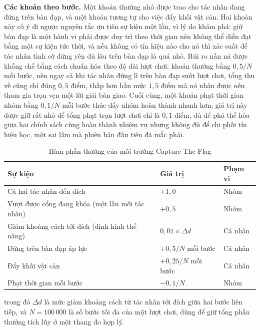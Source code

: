 \indent \textbf{Các khoản theo bước.} Một khoản thưởng nhỏ được trao cho tác nhân đang
đứng trên bàn đạp, và một khoản tương tự cho việc đẩy khối vật cản. Hai khoản này cố ý
đi ngược nguyên tắc ưu tiên sự kiện một lần, vì lý do khám phá: giữ bàn đạp là một hành
vi phải được duy trì theo thời gian nên không thể diễn đạt bằng một sự kiện tức
thời, và nếu không có tín hiệu nào cho nó thì xác suất để tác nhân tình cờ đứng yên đủ
lâu trên bàn đạp là quá nhỏ. Rủi ro nấn ná được khống chế bằng cách chuẩn hóa theo độ
dài lượt chơi: khoản thưởng bằng $0{,}5/N$ mỗi bước, nên ngay cả khi tác nhân đứng lì
trên bàn đạp suốt lượt chơi, tổng thu về cũng chỉ đúng $0{,}5$ điểm, thấp hơn hẳn mức
$1{,}5$ điểm mà nó nhận được nếu tham gia trọn vẹn một lời giải bàn giao. Cuối cùng, một
khoản phạt thời gian nhóm bằng $0{,}1/N$ mỗi bước thúc đẩy nhóm hoàn thành nhanh hơn;
giá trị này được giữ rất nhỏ để tổng phạt trọn lượt chơi chỉ là $0{,}1$ điểm, đủ để phá
thế hòa giữa hai chính sách cùng hoàn thành nhiệm vụ nhưng không đủ để chi phối tín hiệu
học, một sai lầm mà phiên bản đầu tiên đã mắc phải.

\begin{table}[H]
\centering
\caption{Hàm phần thưởng của môi trường Capture The Flag}
\label{tab:reward_capture}
\renewcommand{\arraystretch}{1.4}
\tablefont
\begin{tabular}{|p{7cm}|>{\centering\arraybackslash}p{3.4cm}|>{\centering\arraybackslash}p{2.8cm}|}
\hline
\textbf{Sự kiện} & \textbf{Giá trị} & \textbf{Phạm vi} \\
\hline
Cả hai tác nhân đến đích & $+1{,}0$ & Nhóm \\
\hline
Vượt được cổng đang khóa (một lần mỗi tác nhân) & $+0{,}5$ & Nhóm \\
\hline
Giảm khoảng cách tới đích (định hình thế năng) & $0{,}01 \times \Delta d$ & Cá nhân \\
\hline
Đứng trên bàn đạp áp lực & $+0{,}5/N$ mỗi bước & Cá nhân \\
\hline
Đẩy khối vật cản & $+0{,}25/N$ mỗi bước & Cá nhân \\
\hline
Phạt thời gian mỗi bước & $-0{,}1/N$ & Nhóm \\
\hline
\end{tabular}
\end{table}

\noindent trong đó $\Delta d$ là mức giảm khoảng cách từ tác nhân tới đích giữa hai bước
liên tiếp, và $N = 100\,000$ là số bước tối đa của một lượt chơi, dùng để giữ tổng phần
thưởng tích lũy ở một thang đo hợp lý.

